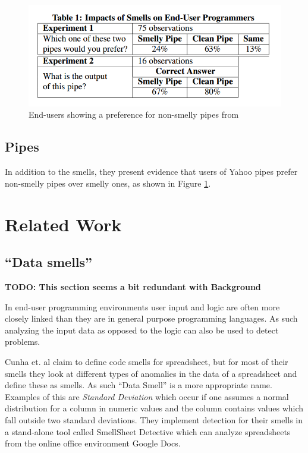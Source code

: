 \documentclass[10pt,conference,compsocconf]{IEEEtran}
\newcommand{\todo}[1]{\textbf{TODO: #1}}
\begin{document}
\begin{figure}
\centering
\includegraphics[width=\columnwidth]{Table1-Stolee2011}
\caption{End-users showing a preference for non-smelly pipes from \cite{Stolee2011}}
\label{fig:Table1-Stolee2011}
\end{figure}


\subsection{Pipes}

In addition to the smells, they present evidence that users of Yahoo pipes prefer non-smelly pipes over smelly ones, as shown in Figure \ref{fig:Table1-Stolee2011}.


\section{Related Work}
\label{sec:related_work}

\subsection{``Data smells''}
\label{subsec:related_datasmells}
\todo{This section seems a bit redundant with Background}

In end-user programming environments user input and logic are often more closely linked than they are in general purpose programming languages.
As such analyzing the input data as opposed to the logic can also be used to detect problems.

Cunha et. al \cite{cunha2012towards} claim to define code smells for spreadsheet, but for most of their smells they look at different types of anomalies in the data of a spreadsheet and define these as smells.
As such ``Data Smell'' is a more appropriate name.
Examples of this are \textit{Standard Deviation} which occur if one assumes a normal distribution for a column in numeric values and the column contains values which fall outside two standard deviations.
They implement detection for their smells in a stand-alone tool called SmellSheet Detective which can analyze spreadsheets from the online office environment Google Docs.
\end{document}
